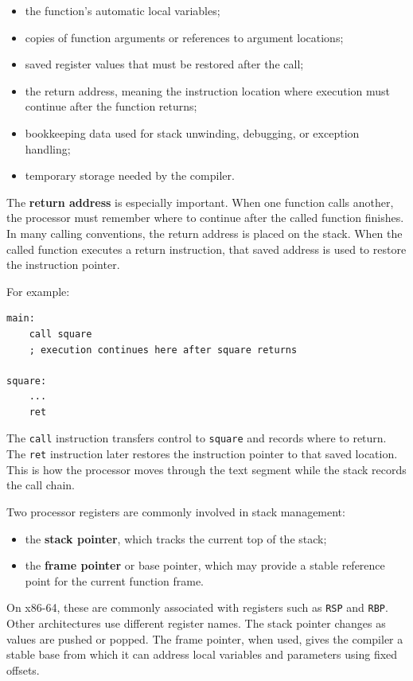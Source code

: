 \begin{itemize}
    \item the function's automatic local variables;
    \item copies of function arguments or references to argument locations;
    \item saved register values that must be restored after the call;
    \item the return address, meaning the instruction location where execution must continue after the function returns;
    \item bookkeeping data used for stack unwinding, debugging, or exception handling;
    \item temporary storage needed by the compiler.
\end{itemize}

The \textbf{return address} is especially important. When one function calls another, the processor must remember where to continue after the called function finishes. In many calling conventions, the return address is placed on the stack. When the called function executes a return instruction, that saved address is used to restore the instruction pointer.

For example:

\begin{verbatim}
main:
    call square
    ; execution continues here after square returns

square:
    ...
    ret
\end{verbatim}

The \texttt{call} instruction transfers control to \texttt{square} and records where to return. The \texttt{ret} instruction later restores the instruction pointer to that saved location. This is how the processor moves through the text segment while the stack records the call chain.

Two processor registers are commonly involved in stack management:

\begin{itemize}
    \item the \textbf{stack pointer}, which tracks the current top of the stack;
    \item the \textbf{frame pointer} or base pointer, which may provide a stable reference point for the current function frame.
\end{itemize}

On x86-64, these are commonly associated with registers such as \texttt{RSP} and \texttt{RBP}. Other architectures use different register names. The stack pointer changes as values are pushed or popped. The frame pointer, when used, gives the compiler a stable base from which it can address local variables and parameters using fixed offsets.

